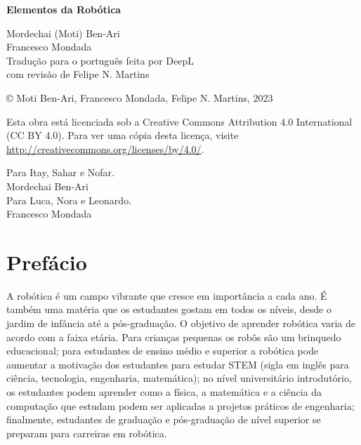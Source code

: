 
\begin{center}
\mbox{}

\vspace{6ex}

\textsf{\bfseries\huge Elementos da Robótica}

\vspace{16ex}

\textsf{\large Mordechai (Moti) Ben-Ari\\[4pt]Francesco Mondada\\[20pt]
Tradução para o português feita por DeepL\\[4pt]com revisão de Felipe N. Martins}

\end{center}

\vfill

\begin{center}
\copyright{} Moti Ben-Ari, Francesco Mondada, Felipe N. Martins, $2023$
 \end{center}
 
\begin{small}
Esta obra está licenciada sob a Creative Commons Attribution 4.0 International (CC BY 4.0). Para ver uma cópia desta licença, visite \url{http://creativecommons.org/licenses/by/4.0/}.
\end{small}


\newpage
\mbox{}
\vfill
\begin{flushright}
Para Itay, Sahar e Nofar.\\[4pt]
Mordechai Ben-Ari\\[18pt]

Para Luca, Nora e Leonardo.\\[4pt]
Francesco Mondada
\end{flushright}
\vfill
\mbox{}
\newpage

\chapter*{Prefácio}

A robótica é um campo vibrante que cresce em importância a cada ano. É também uma matéria que os estudantes gostam em todos os níveis, desde o jardim de infância até a pós-graduação. O objetivo de aprender robótica varia de acordo com a faixa etária. Para crianças pequenas os robôs são um brinquedo educacional; para estudantes de ensino médio e superior a robótica pode aumentar a motivação dos estudantes para estudar STEM (sigla em inglês para ciência, tecnologia, engenharia, matemática); no nível universitário introdutório, os estudantes podem aprender como a física, a matemática e a ciência da computação que estudam podem ser aplicadas a projetos práticos de engenharia; finalmente, estudantes de graduação e pós-graduação de nível superior se preparam para carreiras em robótica.

